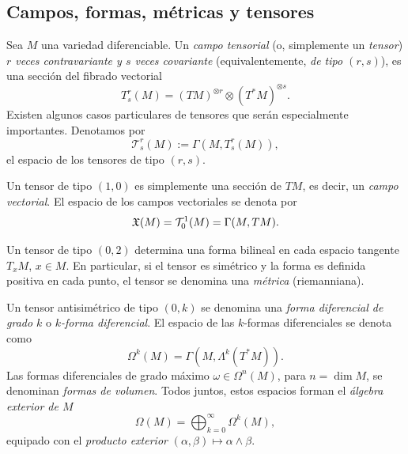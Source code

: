 \documentclass[11pt,a4paper]{amsbook}
\theoremstyle{remark} \newtheorem{rmk}[subsection]{Observación}
\theoremstyle{definition} \newtheorem{defn}[subsection]{Definición}
\theoremstyle{definition} \newtheorem{ex}[subsection]{Ejemplo}
\theoremstyle{definition} \newtheorem{ej}[subsection]{Ejercicio}
\begin{document}
\subsection{Campos, formas, métricas y tensores} Sea $M$ una variedad diferenciable. Un \emph{campo tensorial} (o, simplemente un \emph{tensor}) \emph{$r$ veces contravariante y $s$ veces covariante} (equivalentemente, \emph{de tipo $(r,s)$}), es una sección del fibrado vectorial
\begin{equation*}
T^{r}_s (M) = (TM)^{\otimes r} \otimes (T^*M)^{\otimes s}.
\end{equation*}
Existen algunos casos particulares de tensores que serán especialmente importantes. Denotamos por
\begin{equation*}
\mathcal{T}^r_s(M) := \Gamma(M,T^{r}_s(M)),
\end{equation*}
el espacio de los tensores de tipo $(r,s)$.

Un tensor de tipo $(1,0)$ es simplemente una sección de $TM$, es decir, un \emph{campo vectorial}. El espacio de los campos vectoriales se denota por
\begin{equation*}
\mathfrak X(M) = \mathcal{T}^1_0(M) = \Gamma(M,TM).
\end{equation*}

Un tensor de tipo $(0,2)$ determina una forma bilineal en cada espacio tangente $T_xM$, $x\in M$. En particular, si el tensor es simétrico y la forma es definida positiva en cada punto, el tensor se denomina una \emph{métrica} (riemanniana).

Un tensor antisimétrico de tipo $(0,k)$ se denomina una \emph{forma diferencial de grado $k$} o \emph{$k$-forma diferencial}. El espacio de las $k$-formas diferenciales se denota como
\begin{equation*}
\Omega^k(M) = \Gamma(M, \Lambda^k(T^*M)).
\end{equation*}
Las formas diferenciales de grado máximo $\omega \in \Omega^{n}(M)$, para $n=\dim M$, se denominan \emph{formas de volumen}.
Todos juntos, estos espacios forman el \emph{álgebra exterior de $M$}
\begin{equation*}
\Omega(M) = \bigoplus_{k=0}^{\infty} \Omega^k(M),
\end{equation*}
equipado con el \emph{producto exterior} $(\alpha,\beta) \mapsto \alpha \wedge \beta$.
\end{document}
